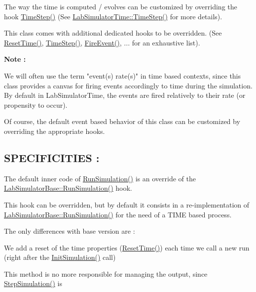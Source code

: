 The way the time is computed / evolves can be customized by overriding the hook \hyperlink{classelps_1_1_lab_simulator_time_a5f3478468090fe5d741759a8806a6abf}{Time\+Step()} (See \hyperlink{classelps_1_1_lab_simulator_time_a5f3478468090fe5d741759a8806a6abf}{Lab\+Simulator\+Time\+::\+Time\+Step()} for more details).

This class comes with additional dedicated hooks to be overridden. (See \hyperlink{classelps_1_1_lab_simulator_time_ad2f79a788d88d06558e17ce65a89f769}{Reset\+Time()}, \hyperlink{classelps_1_1_lab_simulator_time_a5f3478468090fe5d741759a8806a6abf}{Time\+Step()}, \hyperlink{classelps_1_1_lab_simulator_time_a6ed55e9c17248459dfa5c6ab9caee7f5}{Fire\+Event()}, ... for an exhaustive list).

{\bfseries Note \+:} \begin{DoxyVerb}    We will often use the term "event(s) rate(s)" in time based contexts, since
    this class provides a canvas for firing events accordingly to time during the
    simulation. By default in LabSimulatorTime, the events are fired relatively
    to their rate (or propensity to occur).
\end{DoxyVerb}


Of course, the default event based behavior of this class can be customized by overriding the appropriate hooks.

\subsection*{S\+P\+E\+C\+I\+F\+I\+C\+I\+T\+I\+E\+S \+: }

The default inner code of \hyperlink{classelps_1_1_lab_simulator_time_a9cf1c9a315d192ea8c065389788fd2c5}{Run\+Simulation()} is an override of the \hyperlink{classelps_1_1_lab_simulator_base_ab48e943c2b85b25ff96b2aab4d9aa4bd}{Lab\+Simulator\+Base\+::\+Run\+Simulation()} hook.

This hook can be overridden, but by default it consists in a re-\/implementation of \hyperlink{classelps_1_1_lab_simulator_base_ab48e943c2b85b25ff96b2aab4d9aa4bd}{Lab\+Simulator\+Base\+::\+Run\+Simulation()} for the need of a T\+I\+M\+E based process.

The only differences with base version are \+:


\begin{DoxyItemize}
\item We add a reset of the time properties (\hyperlink{classelps_1_1_lab_simulator_time_ad2f79a788d88d06558e17ce65a89f769}{Reset\+Time()}) each time we call a new run (right after the \hyperlink{classelps_1_1_lab_simulator_base_aa14aa05df8173ffd2a2e67aa25f3cea5}{Init\+Simulation()} call)
\item This method is no more responsible for managing the output, since \hyperlink{classelps_1_1_lab_simulator_time_ad8845591018d7d9bdf38932faa2a04dd}{Step\+Simulation()} is
\end{DoxyItemize}


